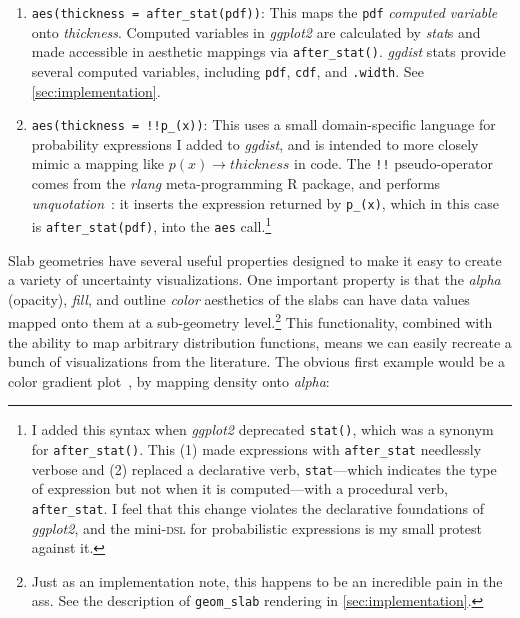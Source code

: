 \documentclass[journal]{vgtc}                     %
\begin{document}
\begin{enumerate}
    \item \texttt{aes(thickness = after\_stat(pdf))}: This maps the \texttt{pdf} \textit{computed variable} onto \textit{thickness}. Computed variables in \textit{ggplot2} are calculated by \textit{stat}s and made accessible in aesthetic mappings via \texttt{after\_stat()}. \textit{ggdist} stats provide several computed variables, including \texttt{pdf}, \texttt{cdf}, and \texttt{.width}. See \cref{sec:implementation}.
    \item \texttt{aes(thickness = !!p\_(x))}:  This uses a small domain-specific language for probability expressions I added to \textit{ggdist}, and is intended to more closely mimic a mapping like $p(x) \rightarrow thickness$ in code. The \texttt{!!} pseudo-operator comes from the \textit{rlang} meta-programming R package, and performs \textit{unquotation}~\cite{wickham2019advanced}: it inserts the expression returned by \texttt{p\_(x)}, which in this case is \texttt{after\_stat(pdf)}, into the \texttt{aes} call.\footnote{\label{foot:after-stat} I added this syntax when \textit{ggplot2} deprecated \texttt{stat()}, which was a synonym for \texttt{after\_stat()}. This (1) made expressions with \texttt{after\_stat} needlessly verbose and (2) replaced a declarative verb, \texttt{stat}---which indicates the type of expression but not when it is computed---with a procedural verb, \texttt{after\_stat}. I feel that this change violates the declarative foundations of \textit{ggplot2}, and the mini-\textsc{dsl} for probabilistic expressions is my small protest against it.}
\end{enumerate}

Slab geometries have several useful properties designed to make it easy to create a variety of uncertainty visualizations. One important property is that the \textit{alpha} (opacity), \textit{fill}, and outline \textit{color} aesthetics of the slabs can have data values mapped onto them at a sub-geometry level.\footnote{Just as an implementation note, this happens to be an incredible pain in the ass. See the description of \texttt{geom\_slab} rendering in \cref{sec:implementation}.} This functionality, combined with the ability to map arbitrary distribution functions, means we can easily recreate a bunch of visualizations from the literature. The obvious first example would be a color gradient plot~\cite{jackson2008displaying}, by mapping density onto \textit{alpha}:
\end{document}
